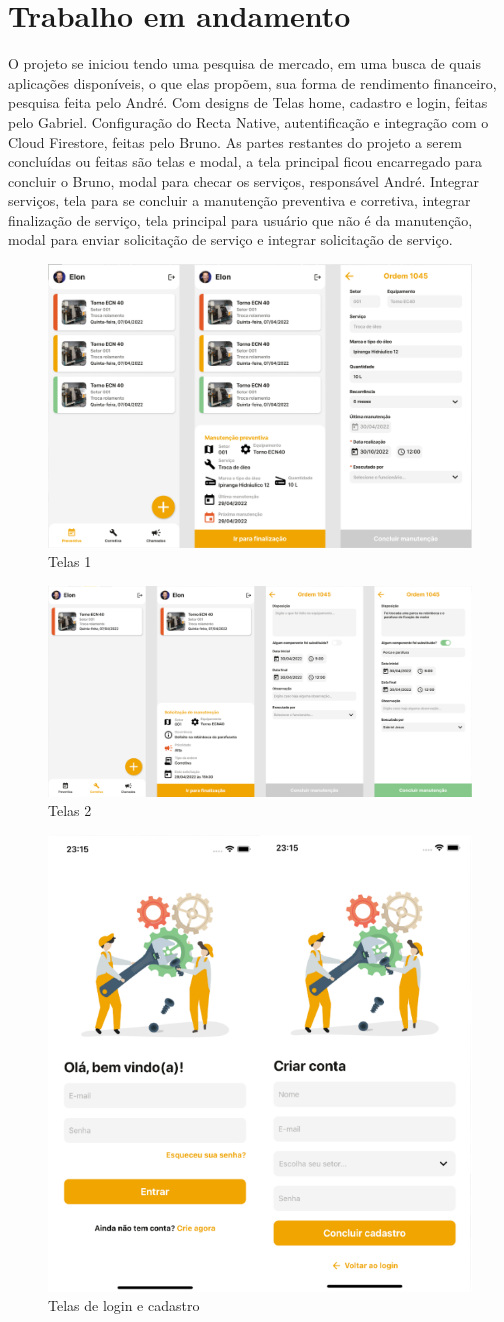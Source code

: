 \documentclass[%
  a4paper,%
  12pt,%
  english,%
  brazilian,%
]{article}
\begin{document}
\section{Trabalho em andamento}%
O projeto se iniciou tendo uma pesquisa de mercado, em uma busca de quais aplicações disponíveis, o que elas propõem, sua forma de rendimento financeiro, pesquisa feita pelo André. Com designs de Telas home, cadastro e login, feitas pelo Gabriel. Configuração do Recta Native, autentificação e integração com o Cloud Firestore, feitas pelo Bruno.
As partes restantes do projeto a serem concluídas ou feitas são telas e modal, a tela principal ficou encarregado para concluir o Bruno, modal para checar os serviços, responsável André. Integrar serviços, tela para se concluir a manutenção preventiva e corretiva, integrar finalização de serviço, tela principal para usuário que não é da manutenção, modal para enviar solicitação de serviço e integrar solicitação de serviço.\begin{figure}[!htb]
\includegraphics[width = 0.6\linewidth]{Figures/t1.PNG}
\caption{Telas 1}
\end{figure}

\begin{figure}[!htb]
\includegraphics[width = 0.6\linewidth]{Figures/t2.PNG}
\caption{Telas 2}
\end{figure}

\begin{figure}[!htb]
\includegraphics[width = 0.35\linewidth]{Figures/t3.PNG}
\caption{Telas de login e cadastro}
\end{figure}
\end{document}
